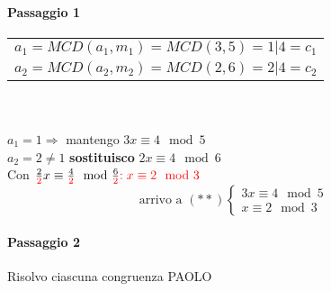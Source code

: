 \paragraph{Passaggio 1} 
\begin{tabular}{c}
    $a_1=MCD(a_1,m_1)=MCD(3,5)=1|4=c_1$\\
    $a_2=MCD(a_2,m_2)=MCD(2,6)=2|4=c_2$
\end{tabular}
\\
\\
$a_1=1\Longrightarrow $ mantengo $3x\equiv 4\mod 5$\\
$a_2=2\neq1 $ \textbf{sostituisco}  $2x\equiv 4\mod 6$\\
Con $\frac{2}{\color{red} 2}x\equiv \frac{4}{\color{red} 2} \mod \frac{6}{\color{red} 2}{\color{red} : x\equiv 2\mod 3}$
$$
\textrm{arrivo a }(**)
\begin{cases}
    3x\equiv 4\mod 5\\
    x\equiv 2\mod 3
\end{cases}
$$

\paragraph{Passaggio 2} Risolvo ciascuna congruenza {\color{purple} PAOLO}  %
